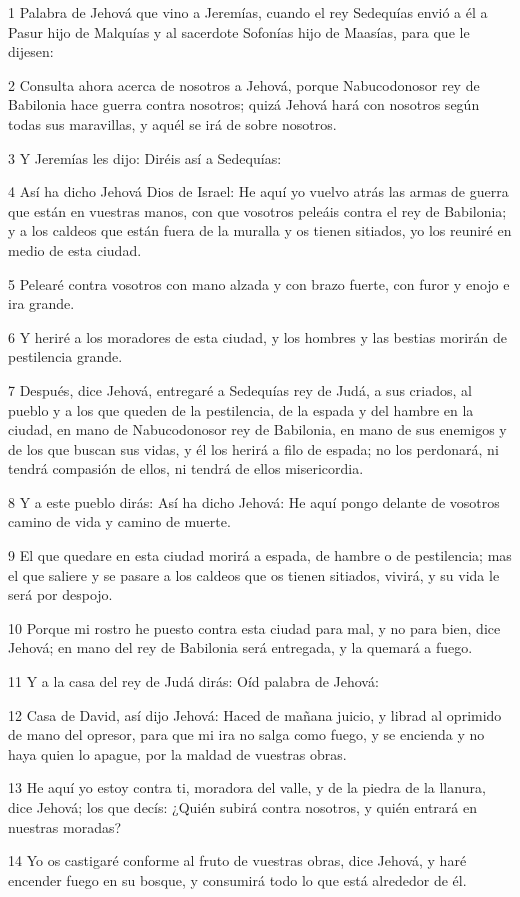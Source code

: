 \par 1 Palabra de Jehová que vino a Jeremías, cuando el rey Sedequías envió a él a Pasur hijo de Malquías y al sacerdote Sofonías hijo de Maasías, para que le dijesen:
\par 2 Consulta ahora acerca de nosotros a Jehová, porque Nabucodonosor rey de Babilonia hace guerra contra nosotros; quizá Jehová hará con nosotros según todas sus maravillas, y aquél se irá de sobre nosotros.
\par 3 Y Jeremías les dijo: Diréis así a Sedequías:
\par 4 Así ha dicho Jehová Dios de Israel: He aquí yo vuelvo atrás las armas de guerra que están en vuestras manos, con que vosotros peleáis contra el rey de Babilonia; y a los caldeos que están fuera de la muralla y os tienen sitiados, yo los reuniré en medio de esta ciudad.
\par 5 Pelearé contra vosotros con mano alzada y con brazo fuerte, con furor y enojo e ira grande.
\par 6 Y heriré a los moradores de esta ciudad, y los hombres y las bestias morirán de pestilencia grande.
\par 7 Después, dice Jehová, entregaré a Sedequías rey de Judá, a sus criados, al pueblo y a los que queden de la pestilencia, de la espada y del hambre en la ciudad, en mano de Nabucodonosor rey de Babilonia, en mano de sus enemigos y de los que buscan sus vidas, y él los herirá a filo de espada; no los perdonará, ni tendrá compasión de ellos, ni tendrá de ellos misericordia.
\par 8 Y a este pueblo dirás: Así ha dicho Jehová: He aquí pongo delante de vosotros camino de vida y camino de muerte.
\par 9 El que quedare en esta ciudad morirá a espada, de hambre o de pestilencia; mas el que saliere y se pasare a los caldeos que os tienen sitiados, vivirá, y su vida le será por despojo.
\par 10 Porque mi rostro he puesto contra esta ciudad para mal, y no para bien, dice Jehová; en mano del rey de Babilonia será entregada, y la quemará a fuego.
\par 11 Y a la casa del rey de Judá dirás: Oíd palabra de Jehová:
\par 12 Casa de David, así dijo Jehová: Haced de mañana juicio, y librad al oprimido de mano del opresor, para que mi ira no salga como fuego, y se encienda y no haya quien lo apague, por la maldad de vuestras obras.
\par 13 He aquí yo estoy contra ti, moradora del valle, y de la piedra de la llanura, dice Jehová; los que decís: ¿Quién subirá contra nosotros, y quién entrará en nuestras moradas?
\par 14 Yo os castigaré conforme al fruto de vuestras obras, dice Jehová, y haré encender fuego en su bosque, y consumirá todo lo que está alrededor de él.

